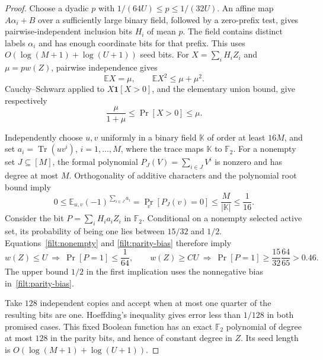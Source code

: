 \documentclass[11pt,letterpaper]{article}
\theoremstyle{definition}
\theoremstyle{remark}
\begin{document}
\begin{proof}
Choose a dyadic $p$ with $1/(64U)\le p\le1/(32U)$.  An affine map
$A\alpha_i+B$ over a sufficiently large binary field, followed by a
zero-prefix test, gives pairwise-independent inclusion bits $H_i$ of
mean $p$.  The field contains distinct labels $\alpha_i$ and has enough
coordinate bits for that prefix.  This uses
$O(\log(M+1)+\log(U+1))$ seed bits.
For $X=\sum_i H_iZ_i$ and $\mu=pw(Z)$, pairwise independence gives
\[
 \mathbb E X=\mu,\qquad
 \mathbb E X^2\le\mu+\mu^2.
\]
Cauchy--Schwarz applied to $X\mathbf1[X>0]$, and the elementary union
bound, give respectively
\begin{equation}\label{filt:nonempty}
 \frac{\mu}{1+\mu}\le\Pr[X>0]\le\mu.
\end{equation}

Independently choose $u,v$ uniformly in a binary field $\mathbb K$ of
order at least $16M$, and set $a_i=\operatorname{Tr}(uv^i)$,
$i=1,\ldots,M$, where the trace maps $\mathbb K$ to $\mathbb F_2$.
For a nonempty set $J\subseteq[M]$, the formal polynomial
$P_J(V)=\sum_{i\in J}V^i$ is nonzero and has degree at most $M$.
Orthogonality of additive characters and the polynomial root bound imply
\begin{equation}\label{filt:parity-bias}
 0\le\mathbb E_{u,v}(-1)^{\sum_{i\in J}a_i}
 =\Pr_v[P_J(v)=0]\le\frac{M}{|\mathbb K|}\le\frac1{16}.
\end{equation}
Consider the bit $P=\sum_i H_i a_i Z_i$ in $\mathbb F_2$.  Conditional
on a nonempty selected active set, its probability of being one lies
between $15/32$ and $1/2$.  Equations~\eqref{filt:nonempty} and
\eqref{filt:parity-bias} therefore imply
\[
 w(Z)\le U\ \Longrightarrow\ \Pr[P=1]\le\frac1{64},
 \qquad
 w(Z)\ge CU\ \Longrightarrow\
 \Pr[P=1]\ge\frac{15}{32}\frac{64}{65}>0.46.
\]
The upper bound $1/2$ in the first implication uses the nonnegative bias
in~\eqref{filt:parity-bias}.

Take $128$ independent copies and accept when at most one quarter of
the resulting bits are one.  Hoeffding's inequality gives error less
than $1/128$ in both promised cases.  This fixed Boolean function has an
exact $\mathbb F_2$ polynomial of degree at most $128$ in the parity bits,
and hence of constant degree in $Z$.  Its seed length is
$O(\log(M+1)+\log(U+1))$.


\end{proof}
\end{document}
